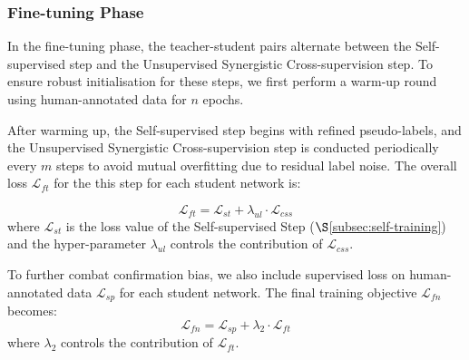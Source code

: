 \subsubsection{Fine-tuning Phase}
\label{sec:fine-tuning-stage}

In the fine-tuning phase, the teacher-student pairs alternate between the Self-supervised step and the Unsupervised Synergistic Cross-supervision step. To ensure robust initialisation for these steps, we first perform a warm-up round using human-annotated data for $n$ epochs.

After warming up, the Self-supervised step begins with refined pseudo-labels, and the Unsupervised Synergistic Cross-supervision step is conducted periodically every $m$ steps to avoid mutual overfitting due to residual label noise. The overall loss $\mathcal{L}_{ft}$ for the this step for each student network is:

\begin{equation}
\label{eq:finetune-loss}
\mathcal{L}_{ft} = \mathcal{L}_{st} + \lambda_{ul} \cdot \mathcal{L}_{css}
\end{equation}
\noindent
where $\mathcal{L}_{st}$ is the loss value of the Self-supervised Step ($\S$\ref{subsec:self-training}) and the hyper-parameter $\lambda_{ul}$ controls the contribution of $\mathcal{L}_{css}$.

To further combat confirmation bias, we also include supervised loss on human-annotated data $\mathcal{L}_{sp}$ for each student network. The final training objective $\mathcal{L}_{fn}$ becomes:
\begin{equation}
    \label{eq:total-loss}
    \mathcal{L}_{fn} = \mathcal{L}_{sp} + \lambda_2 \cdot \mathcal{L}_{ft}
\end{equation}
where $\lambda_2$ controls the contribution of $\mathcal{L}_{ft}$.